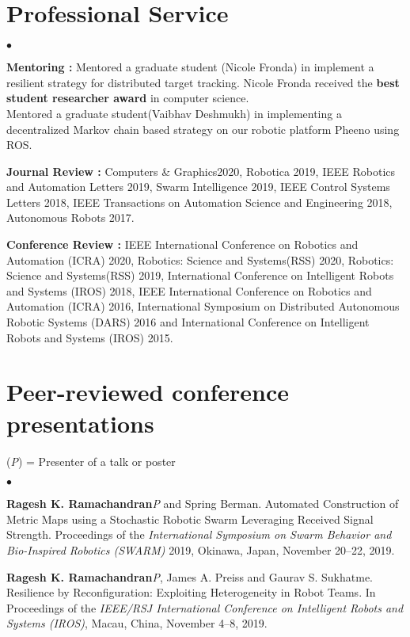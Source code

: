 \documentclass[margin,line]{res}
\newenvironment{list2}{
  \begin{list}{$\bullet$}{%
      \setlength{\itemsep}{0in}
      \setlength{\parsep}{0in} \setlength{\parskip}{0in}
      \setlength{\topsep}{0in} \setlength{\partopsep}{0in} 
      \setlength{\leftmargin}{0.2in}}}{\end{list}}
\begin{document}
\begin{resume}
\section{\sc Professional Service}
\begin{list2}
	\item \textbf{Mentoring :} Mentored a graduate student (Nicole Fronda) in implement a resilient strategy for distributed target tracking. Nicole Fronda received the \textbf{best student researcher award} in computer science.\\
	Mentored a graduate student(Vaibhav Deshmukh) in implementing a decentralized Markov chain based strategy on our robotic platform Pheeno using ROS. 
	\item \textbf{Journal Review :} Computers \& Graphics2020, Robotica 2019, IEEE Robotics and Automation Letters 2019, Swarm Intelligence 2019, IEEE Control Systems Letters 2018, IEEE Transactions on Automation Science and Engineering 2018, Autonomous Robots 2017.
	\item \textbf{Conference Review :} IEEE International Conference on Robotics and Automation (ICRA) 2020, Robotics: Science and Systems(RSS) 2020, Robotics: Science and Systems(RSS) 2019, International Conference on Intelligent Robots and Systems (IROS) 2018, IEEE International Conference on Robotics and Automation (ICRA) 2016, International Symposium on Distributed Autonomous Robotic Systems (DARS) 2016 and International Conference on Intelligent Robots and Systems (IROS) 2015. 
\end{list2}


\section{\sc Peer-reviewed conference presentations}
(\textit{P}) = Presenter of a talk or poster
\begin{list2}
	\item \textbf{Ragesh K. Ramachandran}\textit{P} and Spring Berman. Automated Construction of Metric Maps using a Stochastic Robotic Swarm Leveraging Received Signal Strength. Proceedings of the \textit{International Symposium on Swarm Behavior and Bio-Inspired Robotics (SWARM)} 2019, Okinawa, Japan, November 20–22, 2019.
	
	\item \textbf{Ragesh K. Ramachandran}\textit{P}, James A. Preiss and Gaurav S. Sukhatme. Resilience by Reconfiguration: Exploiting Heterogeneity in Robot Teams. In Proceedings of the \textit{ IEEE/RSJ International Conference on Intelligent Robots and Systems (IROS)}, Macau, China, November 4–8, 2019.
	

\end{list2}
\end{resume}
\end{document}
